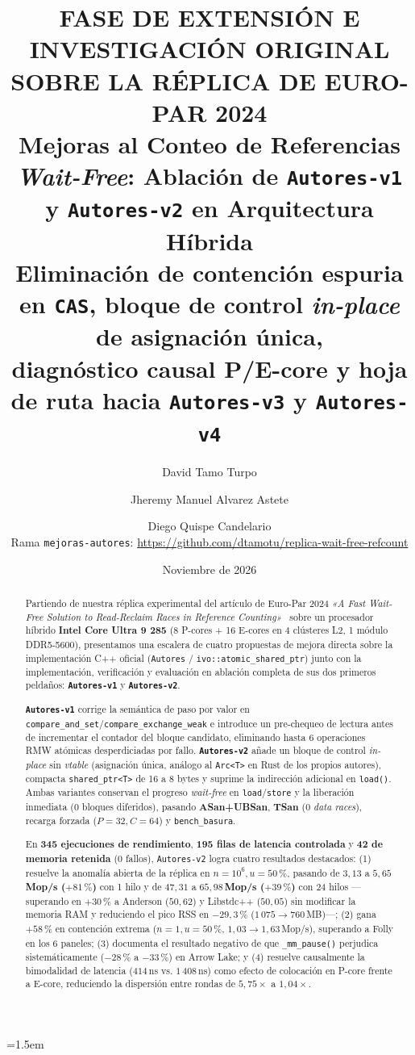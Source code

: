 \documentclass[11pt,a4paper]{article}
\title{%
  {\small\color{acento}\textbf{FASE DE EXTENSIÓN E INVESTIGACIÓN ORIGINAL SOBRE LA RÉPLICA DE EURO-PAR 2024}}\\[4pt]
  \textbf{\LARGE Mejoras al Conteo de Referencias \emph{Wait-Free}: Ablación de \texttt{Autores-v1} y \texttt{Autores-v2} en Arquitectura Híbrida}\\[6pt]
  {\large Eliminación de contención espuria en \texttt{CAS}, bloque de control \emph{in-place} de asignación única,\\
  diagnóstico causal P/E-core y hoja de ruta hacia \texttt{Autores-v3} y \texttt{Autores-v4}}
}
\author{%
  David Tamo Turpo \and Jheremy Manuel Alvarez Astete \and Diego Quispe Candelario\\[4pt]
  {\small Rama \texttt{mejoras-autores}: \url{https://github.com/dtamotu/replica-wait-free-refcount}}
}
\date{Noviembre de 2026}
\begin{document}
\emergencystretch=1.5em
\maketitle

\begin{abstract}
\noindent
Partiendo de nuestra réplica experimental del artículo de Euro-Par 2024 \emph{«A Fast Wait-Free Solution to Read-Reclaim Races in Reference Counting»}~\cite{dewolff2024waitfree} sobre un procesador híbrido \textbf{Intel Core Ultra 9 285} (8 P-cores + 16 E-cores en 4 clústeres L2, 1 módulo DDR5-5600), presentamos una escalera de cuatro propuestas de mejora directa sobre la implementación C++ oficial (\texttt{Autores} / \texttt{ivo::atomic\_shared\_ptr}) junto con la implementación, verificación y evaluación en ablación completa de sus dos primeros peldaños: \textbf{\texttt{Autores-v1}} y \textbf{\texttt{Autores-v2}}.

\textbf{\texttt{Autores-v1}} corrige la semántica de paso por valor en \texttt{compare\_and\_set}/\texttt{compare\_exchange\_weak} e introduce un pre-chequeo de lectura antes de incrementar el contador del bloque candidato, eliminando hasta 6 operaciones RMW atómicas desperdiciadas por fallo. \textbf{\texttt{Autores-v2}} añade un bloque de control \emph{in-place} sin \emph{vtable} (asignación única, análogo al \texttt{Arc<T>} en Rust de los propios autores), compacta \texttt{shared\_ptr<T>} de 16 a 8 bytes y suprime la indirección adicional en \texttt{load()}. Ambas variantes conservan el progreso \emph{wait-free} en \texttt{load}/\texttt{store} y la liberación inmediata (0 bloques diferidos), pasando \textbf{ASan+UBSan}, \textbf{TSan} (0 \emph{data races}), recarga forzada ($P=32, C=64$) y \texttt{bench\_basura}.

En \textbf{345 ejecuciones de rendimiento}, \textbf{195 filas de latencia controlada} y \textbf{42 de memoria retenida} (0 fallos), \texttt{Autores-v2} logra cuatro resultados destacados: (1) resuelve la anomalía abierta de la réplica en $n=10^6, u=50\,\%$, pasando de $3{,}13$ a \textbf{$5{,}65$\,Mop/s ($+81\,\%$)} con 1 hilo y de $47{,}31$ a \textbf{$65{,}98$\,Mop/s ($+39\,\%$)} con 24 hilos —superando en $+30\,\%$ a Anderson ($50{,}62$) y Libstdc++ ($50{,}05$) sin modificar la memoria RAM y reduciendo el pico RSS en \textbf{$-29{,}3\,\%$} ($1\,075 \to 760$\,MB)—; (2) gana \textbf{$+58\,\%$} en contención extrema ($n=1, u=50\,\%$, $1{,}03 \to 1{,}63$\,Mop/s), superando a Folly en los 6 paneles; (3) documenta el resultado negativo de que \texttt{\_mm\_pause()} perjudica sistemáticamente ($-28\,\%$ a $-33\,\%$) en Arrow Lake; y (4) resuelve causalmente la bimodalidad de latencia ($414$\,ns vs. $1\,408$\,ns) como efecto de colocación en P-core frente a E-core, reduciendo la dispersión entre rondas de $5{,}75\times$ a \textbf{$1{,}04\times$}.
\end{abstract}
\end{document}
